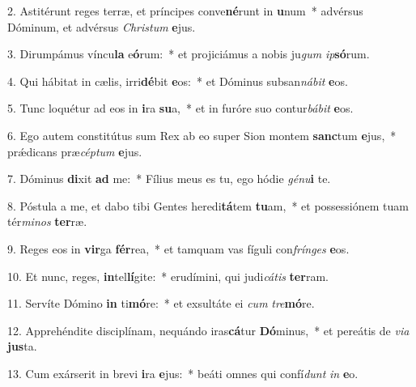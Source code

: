 2. Astitérunt reges terræ, et príncipes conve\textbf{né}runt in \textbf{u}num~*  advérsus Dóminum, et advérsus \textit{Chris}\textit{tum} \textbf{e}jus.\

3. Dirumpámus víncu\textbf{la} e\textbf{ó}rum:~*  et projiciámus a nobis ju\textit{gum} \textit{ip}\textbf{só}rum.\

4. Qui hábitat in cælis, irri\textbf{dé}bit \textbf{e}os:~*  et Dóminus subsan\textit{ná}\textit{bit} \textbf{e}os.\

5. Tunc loquétur ad eos in \textbf{i}ra \textbf{su}a,~*  et in furóre suo contur\textit{bá}\textit{bit} \textbf{e}os.\

6. Ego autem constitútus sum Rex ab eo super Sion montem \textbf{sanc}tum \textbf{e}jus,~*  prǽdicans præ\textit{cép}\textit{tum} \textbf{e}jus.\

7. Dóminus \textbf{di}xit \textbf{ad} me:~*  Fílius meus es tu, ego hódie \textit{gé}\textit{nu}\textbf{i} te.\

8. Póstula a me, et dabo tibi Gentes heredi\textbf{tá}tem \textbf{tu}am,~*  et possessiónem tuam tér\textit{mi}\textit{nos} \textbf{ter}ræ.\

9. Reges eos in \textbf{vir}ga \textbf{fér}rea,~*  et tamquam vas fíguli con\textit{frín}\textit{ges} \textbf{e}os.\

10. Et nunc, reges, \textbf{in}tel\textbf{lí}gite:~*  erudímini, qui judi\textit{cá}\textit{tis} \textbf{ter}ram.\

11. Servíte Dómino \textbf{in} ti\textbf{mó}re:~*  et exsultáte ei \textit{cum} \textit{tre}\textbf{mó}re.\

12. Apprehéndite disciplínam, nequándo iras\textbf{cá}tur \textbf{Dó}minus,~*  et pereátis de \textit{vi}\textit{a} \textbf{jus}ta.\

13. Cum exárserit in brevi \textbf{i}ra \textbf{e}jus:~*  beáti omnes qui confí\textit{dunt} \textit{in} \textbf{e}o.\

